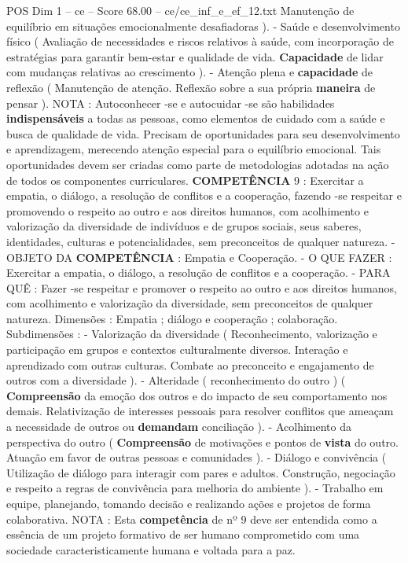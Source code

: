 \begin{textsample}{POS Dim 1 – ce – Score 68.00 – ce/ce\_inf\_e\_ef\_12.txt}
Manutenção de equilíbrio em situações emocionalmente desafiadoras ). - Saúde e desenvolvimento físico ( Avaliação de necessidades e riscos relativos à saúde, com incorporação de estratégias para garantir bem-estar e qualidade de vida. \textbf{Capacidade} de lidar com mudanças relativas ao crescimento ). - Atenção plena e \textbf{capacidade} de reflexão ( Manutenção de atenção.
Reflexão sobre a sua própria \textbf{maneira} de pensar ).
NOTA : Autoconhecer -se e autocuidar -se são habilidades \textbf{indispensáveis} a todas as pessoas, como elementos de cuidado com a saúde e busca de qualidade de vida.
Precisam de oportunidades para seu desenvolvimento e aprendizagem, merecendo atenção especial para o equilíbrio emocional.
Tais oportunidades devem ser criadas como parte de metodologias adotadas na ação de todos os componentes curriculares. \textbf{COMPETÊNCIA} 9 : Exercitar a empatia, o diálogo, a resolução de conflitos e a cooperação, fazendo -se respeitar e promovendo o respeito ao outro e aos direitos humanos, com acolhimento e valorização da diversidade de indivíduos e de grupos sociais, seus saberes, identidades, culturas e potencialidades, sem preconceitos de qualquer natureza. - OBJETO DA \textbf{COMPETÊNCIA} : Empatia e Cooperação. - O QUE FAZER : Exercitar a empatia, o diálogo, a resolução de conflitos e a cooperação. - PARA QUÊ : Fazer -se respeitar e promover o respeito ao outro e aos direitos humanos, com acolhimento e valorização da diversidade, sem preconceitos de qualquer natureza.
Dimensões : Empatia ; diálogo e cooperação ; colaboração.
Subdimensões : - Valorização da diversidade ( Reconhecimento, valorização e participação em grupos e contextos culturalmente diversos.
Interação e aprendizado com outras culturas.
Combate ao preconceito e engajamento de outros com a diversidade ). - Alteridade ( reconhecimento do outro ) ( \textbf{Compreensão} da emoção dos outros e do impacto de seu comportamento nos demais.
Relativização de interesses pessoais para resolver conflitos que ameaçam a necessidade de outros ou \textbf{demandam} conciliação ). - Acolhimento da perspectiva do outro ( \textbf{Compreensão} de motivações e pontos de \textbf{vista} do outro.
Atuação em favor de outras pessoas e comunidades ). - Diálogo e convivência ( Utilização de diálogo para interagir com pares e adultos.
Construção, negociação e respeito a regras de convivência para melhoria do ambiente ). - Trabalho em equipe, planejando, tomando decisão e realizando ações e projetos de forma colaborativa.
NOTA : Esta \textbf{competência} de nº 9 deve ser entendida como a essência de um projeto formativo de ser humano comprometido com uma sociedade caracteristicamente humana e voltada para a paz.

\end{textsample}
